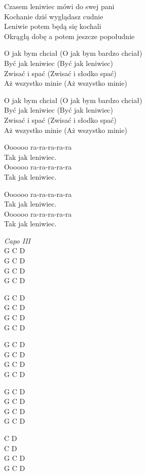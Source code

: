 \begin{text}
Czasem leniwiec mówi do swej pani\\
Kochanie dziś wyglądasz cudnie\\
Leniwie potem będą się kochali\\
Okrągłą dobę a potem jeszcze popołudnie

O jak bym chciał (O jak bym bardzo chciał)\\
Być jak leniwiec (Być jak leniwiec)\\
Zwisać i spać (Zwisać i słodko spać)\\
Aż wszystko minie (Aż wszystko minie)

O jak bym chciał (O jak bym bardzo chciał)\\
Być jak leniwiec (Być jak leniwiec)\\
Zwisać i spać (Zwisać i słodko spać)\\
Aż wszystko minie (Aż wszystko minie)

Oooooo ra-ra-ra-ra-ra\\
Tak jak leniwiec.\\
Oooooo ra-ra-ra-ra-ra\\
Tak jak leniwiec.

Oooooo ra-ra-ra-ra-ra\\
Tak jak leniwiec.\\
Oooooo ra-ra-ra-ra-ra\\
Tak jak leniwiec.
\end{text}
\begin{chord}
    \textit{Capo III}\\
G C D\\
G C D\\
G C D\\
G C D

G C D\\
G C D\\
G C D\\
G C D

G C D\\
G C D\\
G C D\\
G C D

G C D\\
G C D\\
G C D\\
G C D

    \hfill\break
    \hfill\break
    \hfill\break
    \hfill\break

    \hfill\break
    \hfill\break
    \hfill\break
    \hfill\break

    \hfill\break
    \hfill\break
    \hfill\break
    \hfill\break

    \hfill\break
    \hfill\break
    \hfill\break
    \hfill\break

    \hfill\break
    \hfill\break
    \hfill\break
    \hfill\break

C D\\
C D\\
G C D\\
G C D
\end{chord}
